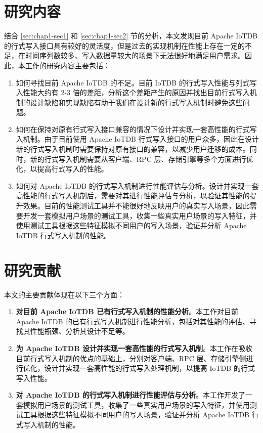 \section{研究内容}
结合 \ref{sec:chap1-sec1} 和 \ref{sec:chap1-sec2} 节的分析，本文发现目前 Apache IoTDB 的行式写入接口具有较好的灵活度，但是过去的实现机制在性能上存在一定的不足，在时间序列数较多、写入数据量较大的场景下无法很好地满足用户需求。因此，本工作的研究内容主要包括：
\begin{enumerate}
  \item 如何寻找目前 Apache IoTDB 的不足。目前 IoTDB 的行式写入性能与列式写入性能大约有 2-3 倍的差距，分析这个差距产生的原因并找出目前行式写入机制的设计缺陷和实现缺陷有助于我们在设计新的行式写入机制时避免这些问题。
  \item 如何在保持对原有行式写入接口兼容的情况下设计并实现一套高性能的行式写入机制。由于目前使用 Apache IoTDB 行式写入接口的用户众多，因此在设计新的行式写入机制时需要保持对原有接口的兼容，以减少用户迁移的成本。同时，新的行式写入机制需要从客户端、RPC 层、存储引擎等多个方面进行优化，以提高行式写入的性能。
  \item 如何对 Apache IoTDB 的行式写入机制进行性能评估与分析。设计并实现一套高性能的行式写入机制后，需要对其进行性能评估与分析，以验证其性能的提升效果。目前的性能测试工具并不能很好地反映用户的真实写入场景，因此需要开发一套模拟用户场景的测试工具，收集一些真实用户场景的写入特征，并使用测试工具根据这些特征模拟不同用户的写入场景，验证并分析 Apache IoTDB 行式写入机制的性能。
\end{enumerate}

\section{研究贡献}
本文的主要贡献体现在以下三个方面：
\begin{enumerate}
  \item \textbf{对目前 Apache IoTDB 已有行式写入机制的性能分析}。本工作对目前 Apache IoTDB 的已有行式写入机制进行性能分析，包括对其性能的评估、寻找其性能瓶颈、分析其设计不足等。
  \item \textbf{为 Apache IoTDB 设计并实现一套高性能的行式写入机制}。本工作在吸收目前行式写入机制的优点的基础上，分别对客户端、RPC 层、存储引擎侧进行优化，设计并实现一套高性能的行式写入处理机制，以提高 IoTDB 的行式写入性能。
  \item \textbf{对 Apache IoTDB 的行式写入机制进行性能评估与分析}。本工作开发了一套模拟用户场景的测试工具，收集了一些真实用户场景的写入特征，并使用测试工具根据这些特征模拟不同用户的写入场景，验证并分析 Apache IoTDB 行式写入机制的性能。
\end{enumerate}

